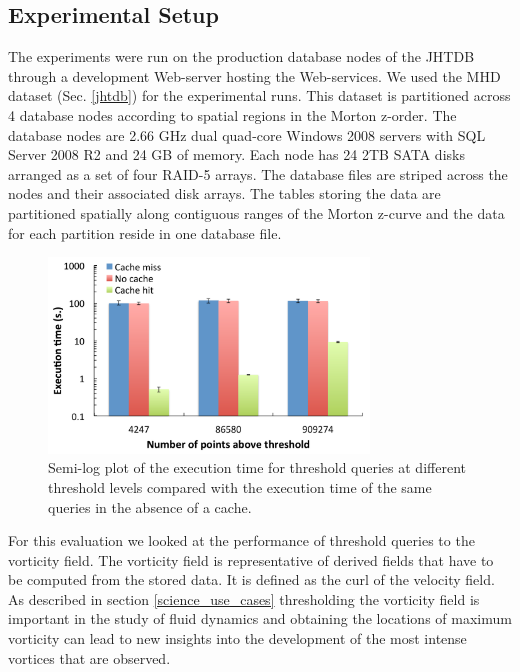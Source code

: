 \documentclass{sig-alternate}
\newcommand{\kk}[1]{{\color{blue}{\it KK: #1}}}
\begin{document}
\subsection{Experimental Setup}
The experiments were run on the production database nodes of the JHTDB through a development Web-server hosting the Web-services. We used
the MHD dataset (Sec. \ref{jhtdb}) for the experimental runs. This dataset is partitioned across 4 database nodes according to spatial regions in the
Morton z-order. 
The database nodes are 2.66 GHz dual quad-core Windows 2008 servers with SQL Server 2008 R2 and 24 GB of memory. Each node has 24 2TB 
SATA disks arranged as a set of four RAID-5 arrays. The database files are striped across the nodes and their associated disk
arrays. The tables storing the data are partitioned spatially along contiguous ranges of the Morton z-curve and the data for each partition reside in one
database file. 

\begin{figure}
\centering
\includegraphics[width=3.35in]{Figures/cache_overhead.pdf}
\caption{Semi-log plot of the execution time for threshold queries at different threshold levels compared with the execution time of the same queries in the
absence of a cache.}
\label{fig:cache_overhead}
\end{figure}

For this evaluation we looked at the performance of threshold queries to the vorticity field. The vorticity field is representative of derived fields that
have to be computed from the stored data. It is defined as the curl of the velocity field.
As described in section \ref{science_use_cases}
thresholding the vorticity field is important in the study of fluid dynamics and obtaining the locations of maximum vorticity can lead to new insights into
the development of the most intense vortices that are observed. 
\end{document}
